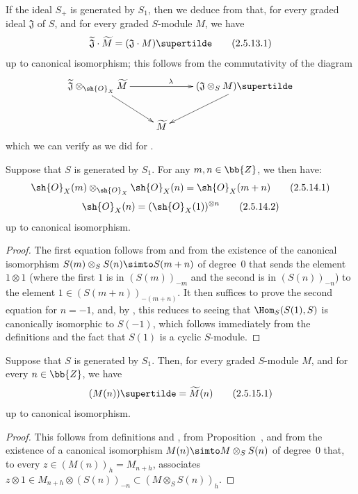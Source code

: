 If the ideal $S_+$ is generated by $S_1$, then we deduce from  that, for every graded ideal $\mathfrak{J}$ of $S$, and for every graded $S$-module $M$, we have
\[
\label{II.2.5.13.1}
  \widetilde{\mathfrak{J}}\cdot\widetilde{M} = (\mathfrak{J}\cdot M)\supertilde
\tag{2.5.13.1}
\]
up to canonical isomorphism;
this follows from the commutativity of the diagram
\[
  \xymatrix{
    \widetilde{\mathfrak{J}}\otimes_{\sh{O}_X}\widetilde{M} \ar[rr]^\lambda \ar[dr]
    && (\mathfrak{J}\otimes_S M)\supertilde \ar[dl]
  \\&\widetilde{M}
  }
\]
which we can verify as we did for .

\begin{corollary}[2.5.14]
\label{II.2.5.14}
Suppose that $S$ is generated by $S_1$.
For any $m,n\in\bb{Z}$, we then have:
\[
\label{II.2.5.14.1}
  \sh{O}_X(m)\otimes_{\sh{O}_X}\sh{O}_X(n) = \sh{O}_X(m+n)
\tag{2.5.14.1}
\]
\[
\label{II.2.5.14.2}
  \sh{O}_X(n) = (\sh{O}_X(1))^{\otimes n}
\tag{2.5.14.2}
\]
up to canonical isomorphism.
\end{corollary}

\begin{proof}
The first equation follows from  and from the existence of the canonical isomorphism $S(m)\otimes_S S(n)\simto S(m+n)$ of degree~$0$ that sends the element $1\otimes1$ (where the first $1$ is in $(S(m))_{-m}$ and the second is in $(S(n))_{-n}$) to the element $1\in(S(m+n))_{-(m+n)}$.
  It then suffices to prove the second equation for $n=-1$, and, by , this reduces to seeing that $\Hom_S(S(1),S)$ is canonically isomorphic to $S(-1)$, which follows immediately from the definitions  and the fact that $S(1)$ is a cyclic $S$-module.
\end{proof}

\begin{corollary}[2.5.15]
\label{II.2.5.15}
Suppose that $S$ is generated by $S_1$.
Then, for every graded $S$-module $M$, and for every $n\in\bb{Z}$, we have
\[
\label{II.2.5.15.1}
  (M(n))\supertilde = \widetilde{M}(n)
\tag{2.5.15.1}
\]
up to canonical isomorphism.
\end{corollary}

\begin{proof}
This follows from definitions  and , from Proposition~, and from the existence of a canonical isomorphism $M(n)\simto M\otimes_S S(n)$ of degree~$0$ that, to every $z\in(M(n))_h=M_{n+h}$, associates $z\otimes1\in M_{n+h}\otimes(S(n))_{-n}\subset(M\otimes_S S(n))_h$.
\end{proof}


